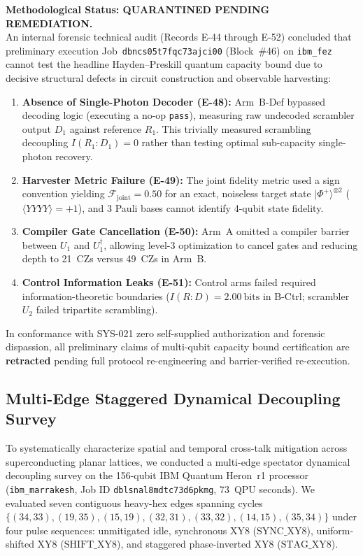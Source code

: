 \documentclass[aps,preprint,superscriptaddress,longbibliography]{revtex4-2}
\begin{document}
\begin{tcolorbox}[colback=red!5!white,colframe=red!75!black,title=Forensic Incident Notice: Protocol Quarantine (E-44 to E-52)]
\textbf{Methodological Status: QUARANTINED PENDING REMEDIATION.} \\
An internal forensic technical audit (Records E-44 through E-52) concluded that preliminary execution Job~\texttt{dbncs05t7fqc73ajci00} (Block~\#46) on \texttt{ibm\_fez} cannot test the headline Hayden--Preskill quantum capacity bound due to decisive structural defects in circuit construction and observable harvesting:
\begin{enumerate}
\item \textbf{Absence of Single-Photon Decoder (E-48):} Arm~B-Def bypassed decoding logic (executing a no-op \texttt{pass}), measuring raw undecoded scrambler output $D_1$ against reference $R_1$. This trivially measured scrambling decoupling $I(R_1:D_1) = 0$ rather than testing optimal sub-capacity single-photon recovery.
\item \textbf{Harvester Metric Failure (E-49):} The joint fidelity metric used a sign convention yielding $\mathcal{F}_{\text{joint}} = 0.50$ for an exact, noiseless target state $|\Phi^+\rangle^{\otimes 2}$ ($\langle YYYY \rangle = +1$), and 3 Pauli bases cannot identify 4-qubit state fidelity.
\item \textbf{Compiler Gate Cancellation (E-50):} Arm~A omitted a compiler barrier between $U_1$ and $U_1^\dagger$, allowing level-3 optimization to cancel gates and reducing depth to 21~CZs versus 49~CZs in Arm~B.
\item \textbf{Control Information Leaks (E-51):} Control arms failed required information-theoretic boundaries ($I(R:D) = 2.00\ \text{bits}$ in B-Ctrl; scrambler $U_2$ failed tripartite scrambling).
\end{enumerate}
In conformance with SYS-021 zero self-supplied authorization and forensic dispassion, all preliminary claims of multi-qubit capacity bound certification are \textbf{retracted} pending full protocol re-engineering and barrier-verified re-execution.
\end{tcolorbox}

\subsection{Multi-Edge Staggered Dynamical Decoupling Survey}
\label{sec:dd_survey}

To systematically characterize spatial and temporal cross-talk mitigation across superconducting planar lattices, we conducted a multi-edge spectator dynamical decoupling survey on the 156-qubit IBM Quantum Heron~r1 processor (\texttt{ibm\_marrakesh}, Job ID \texttt{dblsnal8mdtc73d6pkmg}, 73~QPU seconds). We evaluated seven contiguous heavy-hex edges spanning cycles $\{ (34, 33), (19, 35), (15, 19), (32, 31), (33, 32), (14, 15), (35, 34) \}$ under four pulse sequences: unmitigated idle, synchronous XY8 ($\text{SYNC\_XY8}$), uniform-shifted XY8 ($\text{SHIFT\_XY8}$), and staggered phase-inverted XY8 ($\text{STAG\_XY8}$).
\end{document}
